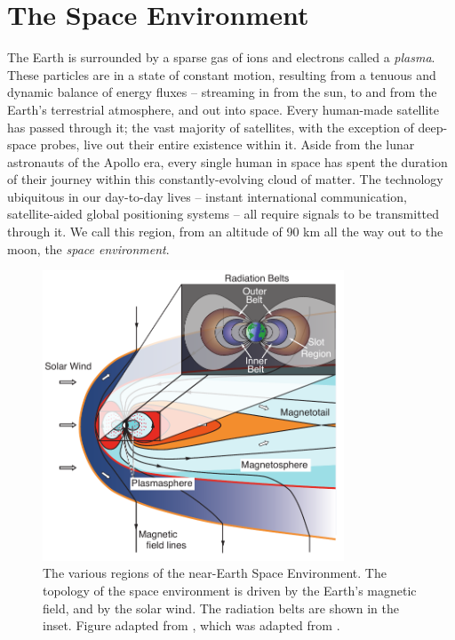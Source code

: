 \section{The Space Environment}
The Earth is surrounded by a sparse gas of ions and electrons called a \emph{plasma}. 
These particles are in a state of constant motion, resulting from a tenuous and dynamic balance of energy fluxes -- streaming in from the sun, to and from the Earth's terrestrial atmosphere, and out into space. Every human-made satellite has passed through it; the vast majority of satellites, with the exception of deep-space probes, live out their entire existence within it. Aside from the lunar astronauts of the Apollo era, every single human in space has spent the duration of their journey within this constantly-evolving cloud of matter. The technology ubiquitous in our day-to-day lives -- instant international communication, satellite-aided global positioning systems -- all require signals to be transmitted through it. We call this region, from an altitude of 90 km all the way out to the moon, the \emph{space environment}.


\begin{figure}[ht!]
\begin{center}
\includegraphics[width=0.8\textwidth]{figures/space_environment_figure.pdf}
\caption[Diagram of the various regions of the space environment]{The various regions of the near-Earth Space Environment. The topology of the space environment is driven by the Earth's magnetic field, and by the solar wind. The radiation belts are shown in the inset. Figure adapted from \cite{Graf2013}, which was adapted from \cite{Hill1991}.}
\label{fig:space_environment}
\end{center}
\end{figure}

